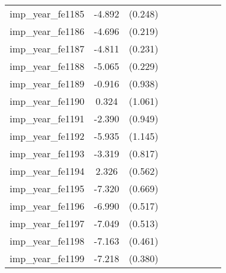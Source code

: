 {\begin{tabular}{l*{4}{cc}}
imp\_year\_fe1185&   -4.892\sym{***}&  (0.248)&                  &         &                  &         &                  &         \\
imp\_year\_fe1186&   -4.696\sym{***}&  (0.219)&                  &         &                  &         &                  &         \\
imp\_year\_fe1187&   -4.811\sym{***}&  (0.231)&                  &         &                  &         &                  &         \\
imp\_year\_fe1188&   -5.065\sym{***}&  (0.229)&                  &         &                  &         &                  &         \\
imp\_year\_fe1189&   -0.916         &  (0.938)&                  &         &                  &         &                  &         \\
imp\_year\_fe1190&    0.324         &  (1.061)&                  &         &                  &         &                  &         \\
imp\_year\_fe1191&   -2.390\sym{*}  &  (0.949)&                  &         &                  &         &                  &         \\
imp\_year\_fe1192&   -5.935\sym{***}&  (1.145)&                  &         &                  &         &                  &         \\
imp\_year\_fe1193&   -3.319\sym{***}&  (0.817)&                  &         &                  &         &                  &         \\
imp\_year\_fe1194&    2.326\sym{***}&  (0.562)&                  &         &                  &         &                  &         \\
imp\_year\_fe1195&   -7.320\sym{***}&  (0.669)&                  &         &                  &         &                  &         \\
imp\_year\_fe1196&   -6.990\sym{***}&  (0.517)&                  &         &                  &         &                  &         \\
imp\_year\_fe1197&   -7.049\sym{***}&  (0.513)&                  &         &                  &         &                  &         \\
imp\_year\_fe1198&   -7.163\sym{***}&  (0.461)&                  &         &                  &         &                  &         \\
imp\_year\_fe1199&   -7.218\sym{***}&  (0.380)&                  &         &                  &         &                  &         \\

\end{tabular}}
